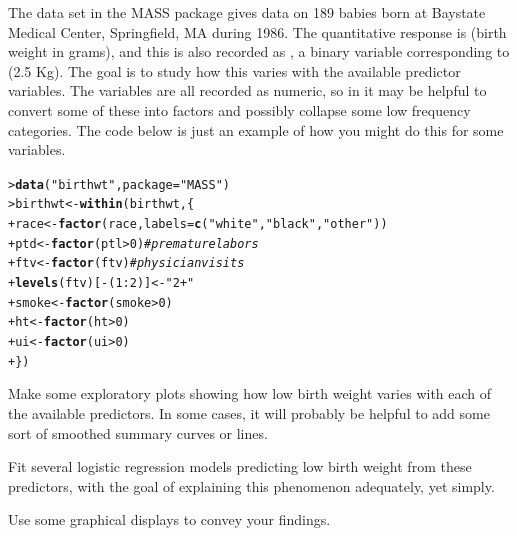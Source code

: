 \documentclass[11pt]{report}\usepackage[]{graphicx}\usepackage[]{color}
\makeatletter
\newcommand{\hlnum}[1]{\textcolor[rgb]{0.686,0.059,0.569}{#1}}%
\newcommand{\hlstr}[1]{\textcolor[rgb]{0.192,0.494,0.8}{#1}}%
\newcommand{\hlcom}[1]{\textcolor[rgb]{0.678,0.584,0.686}{\textit{#1}}}%
\newcommand{\hlopt}[1]{\textcolor[rgb]{0,0,0}{#1}}%
\newcommand{\hlstd}[1]{\textcolor[rgb]{0.345,0.345,0.345}{#1}}%
\newcommand{\hlkwb}[1]{\textcolor[rgb]{0.69,0.353,0.396}{#1}}%
\newcommand{\hlkwc}[1]{\textcolor[rgb]{0.333,0.667,0.333}{#1}}%
\newcommand{\hlkwd}[1]{\textcolor[rgb]{0.737,0.353,0.396}{\textbf{#1}}}%
\newenvironment{kframe}{%
 \def\at@end@of@kframe{}%
 \ifinner\ifhmode%
  \def\at@end@of@kframe{\end{minipage}}%
  \begin{minipage}{\columnwidth}%
 \fi\fi%
 \def\FrameCommand##1{\hskip\@totalleftmargin \hskip-\fboxsep
 \colorbox{shadecolor}{##1}\hskip-\fboxsep
     \hskip-\linewidth \hskip-\@totalleftmargin \hskip\columnwidth}%
 \MakeFramed {\advance\hsize-\width
   \@totalleftmargin\z@ \linewidth\hsize
   \@setminipage}}%
 {\par\unskip\endMakeFramed%
 \at@end@of@kframe}
\newenvironment{knitrout}{}{} %
\renewenvironment{knitrout}{\small\renewcommand{\baselinestretch}{.85}}{} %
\makeatother
\begin{document}
\begin{Exercises}
\exercise The data set  in the MASS package gives data on 189 babies born at Baystate Medical Center, Springfield, MA during 1986. The quantitative response is  (birth weight in grams), and this is also recorded as , a binary variable corresponding to 
 (2.5 Kg).  The goal is to study how this varies with the available predictor variables.  
The variables are all recorded as numeric, so in \R it may be helpful to convert some of these into factors and possibly collapse some low frequency categories.  The code below is just an example of how you might do this for some variables.
\begin{knitrout}
\color{fgcolor}\begin{kframe}
\begin{alltt}
\hlstd{> }\hlkwd{data}\hlstd{(}\hlstr{"birthwt"}\hlstd{,} \hlkwc{package}\hlstd{=}\hlstr{"MASS"}\hlstd{)}
\hlstd{> }\hlstd{birthwt} \hlkwb{<-} \hlkwd{within}\hlstd{(birthwt, \{}
\hlstd{+ }  \hlstd{race} \hlkwb{<-} \hlkwd{factor}\hlstd{(race,} \hlkwc{labels} \hlstd{=} \hlkwd{c}\hlstd{(}\hlstr{"white"}\hlstd{,} \hlstr{"black"}\hlstd{,} \hlstr{"other"}\hlstd{))}
\hlstd{+ }        \hlstd{ptd} \hlkwb{<-} \hlkwd{factor}\hlstd{(ptl} \hlopt{>} \hlnum{0}\hlstd{)}  \hlcom{# premature labors}
\hlstd{+ }        \hlstd{ftv} \hlkwb{<-} \hlkwd{factor}\hlstd{(ftv)}      \hlcom{# physician visits}
\hlstd{+ }        \hlkwd{levels}\hlstd{(ftv)[}\hlopt{-}\hlstd{(}\hlnum{1}\hlopt{:}\hlnum{2}\hlstd{)]} \hlkwb{<-} \hlstr{"2+"}
\hlstd{+ }        \hlstd{smoke} \hlkwb{<-} \hlkwd{factor}\hlstd{(smoke}\hlopt{>}\hlnum{0}\hlstd{)}
\hlstd{+ }        \hlstd{ht} \hlkwb{<-} \hlkwd{factor}\hlstd{(ht}\hlopt{>}\hlnum{0}\hlstd{)}
\hlstd{+ }        \hlstd{ui} \hlkwb{<-} \hlkwd{factor}\hlstd{(ui}\hlopt{>}\hlnum{0}\hlstd{)}
\hlstd{+ }  \hlstd{\})}
\end{alltt}
\end{kframe}
\end{knitrout}

  \begin{enumerate*}
    \item Make some exploratory plots showing how low birth weight varies with each of the available predictors.  In some cases, it will probably be helpful to add some sort of smoothed summary curves or lines.
    \item Fit several logistic regression models predicting low birth weight from these predictors, with the goal of explaining this phenomenon adequately, yet simply.
    \item Use some graphical displays to convey your findings.
  \end{enumerate*}


\end{Exercises}
\end{document}
